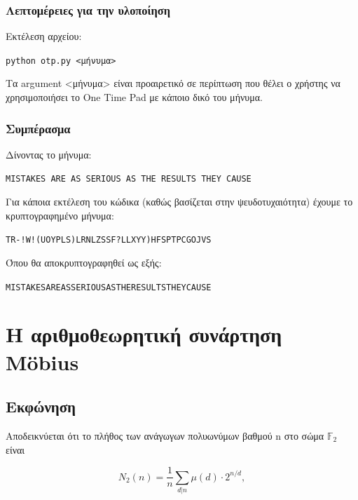 \documentclass[oneside]{article}
\let\t\texttt
\begin{document}
\subsubsection{Λεπτομέρειες για την υλοποίηση}

Εκτέλεση αρχείου:

\begin{center}
    \t{python otp.py <μήνυμα>}
\end{center}

Τα argument <μήνυμα> είναι προαιρετικό σε περίπτωση που θέλει ο χρήστης να χρησιμοποιήσει το One Time Pad με κάποιο δικό του μήνυμα.

\subsubsection{Συμπέρασμα}

Δίνοντας το μήνυμα:

\begin{center}
    \t{MISTAKES ARE AS SERIOUS AS THE RESULTS THEY CAUSE}
\end{center}

Για κάποια εκτέλεση του κώδικα (καθώς βασίζεται στην ψευδοτυχαιότητα) έχουμε το κρυπτογραφημένο μήνυμα: 

\begin{center}
    \t{TR-!W!(UOYPLS)LRNLZSSF?LLXYY)HFSPTPCGOJVS}
\end{center}

Όπου θα αποκρυπτογραφηθεί ως εξής:

\begin{center}
    \t{MISTAKESAREASSERIOUSASTHERESULTSTHEYCAUSE}
\end{center}

\section{Η αριθμοθεωρητική συνάρτηση Möbius}

\subsection{Εκφώνηση}

Αποδεικνύεται ότι το πλήθος των ανάγωγων πολυωνύμων βαθμού n στο σώμα $\mathbb{F}_2$ είναι

\begin{equation}\label{eq:611}
    N_2(n) = \frac{1}{n} \sum_{d|n}\mu(d) \cdot 2^{n/d},
\end{equation}
\end{document}
